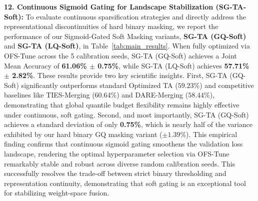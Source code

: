 \textbf{12. Continuous Sigmoid Gating for Landscape Stabilization (SG-TA-Soft):}
To evaluate continuous sparsification strategies and directly address the representational discontinuities of hard binary masking, we report the performance of our Sigmoid-Gated Soft Masking variants, \textbf{SG-TA (GQ-Soft)} and \textbf{SG-TA (LQ-Soft)}, in Table~\ref{tab:main_results}. When fully optimized via OFS-Tune across the 5 calibration seeds, SG-TA (GQ-Soft) achieves a Joint Mean Accuracy of \textbf{61.06\% $\pm$ 0.75\%}, while SG-TA (LQ-Soft) achieves \textbf{57.71\% $\pm$ 2.82\%}. These results provide two key scientific insights. First, SG-TA (GQ-Soft) significantly outperforms standard Optimized TA ($59.23\%$) and competitive baselines like TIES-Merging ($60.64\%$) and DARE-Merging ($58.44\%$), demonstrating that global quantile budget flexibility remains highly effective under continuous, soft gating. Second, and most importantly, SG-TA (GQ-Soft) achieves a standard deviation of only \textbf{0.75\%}, which is nearly half of the variance exhibited by our hard binary GQ masking variant ($\pm 1.39\%$). This empirical finding confirms that continuous sigmoid gating smoothens the validation loss landscape, rendering the optimal hyperparameter selection via OFS-Tune remarkably stable and robust across diverse random calibration seeds. This successfully resolves the trade-off between strict binary thresholding and representation continuity, demonstrating that soft gating is an exceptional tool for stabilizing weight-space fusion.

